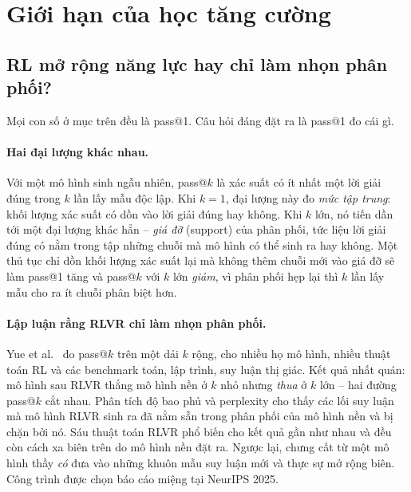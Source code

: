 
\section{Giới hạn của học tăng cường}
\label{sec:rl_limits}

\subsection{RL mở rộng năng lực hay chỉ làm nhọn phân phối?}
\label{ssec:rl_capability_debate}

Mọi con số ở mục trên đều là pass@1. Câu hỏi đáng đặt ra là pass@1 đo cái gì.

\paragraph{Hai đại lượng khác nhau.}
Với một mô hình sinh ngẫu nhiên, pass@$k$ là xác suất có ít nhất một lời giải đúng trong $k$ lần lấy mẫu độc lập. Khi $k = 1$, đại lượng này đo \emph{mức tập trung}: khối lượng xác suất có dồn vào lời giải đúng hay không. Khi $k$ lớn, nó tiến dần tới một đại lượng khác hẳn -- \emph{giá đỡ} (support) của phân phối, tức liệu lời giải đúng có nằm trong tập những chuỗi mà mô hình có thể sinh ra hay không. Một thủ tục chỉ dồn khối lượng xác suất lại mà không thêm chuỗi mới vào giá đỡ sẽ làm pass@1 tăng và pass@$k$ với $k$ lớn \emph{giảm}, vì phân phối hẹp lại thì $k$ lần lấy mẫu cho ra ít chuỗi phân biệt hơn.

\paragraph{Lập luận rằng RLVR chỉ làm nhọn phân phối.}
Yue et al.~\cite{yue2025rlboundary} đo pass@$k$ trên một dải $k$ rộng, cho nhiều họ mô hình, nhiều thuật toán RL và các benchmark toán, lập trình, suy luận thị giác. Kết quả nhất quán: mô hình sau RLVR thắng mô hình nền ở $k$ nhỏ nhưng \emph{thua} ở $k$ lớn -- hai đường pass@$k$ cắt nhau. Phân tích độ bao phủ và perplexity cho thấy các lối suy luận mà mô hình RLVR sinh ra đã nằm sẵn trong phân phối của mô hình nền và bị chặn bởi nó. Sáu thuật toán RLVR phổ biến cho kết quả gần như nhau và đều còn cách xa biên trên do mô hình nền đặt ra. Ngược lại, chưng cất từ một mô hình thầy \emph{có} đưa vào những khuôn mẫu suy luận mới và thực sự mở rộng biên. Công trình được chọn báo cáo miệng tại NeurIPS 2025.

